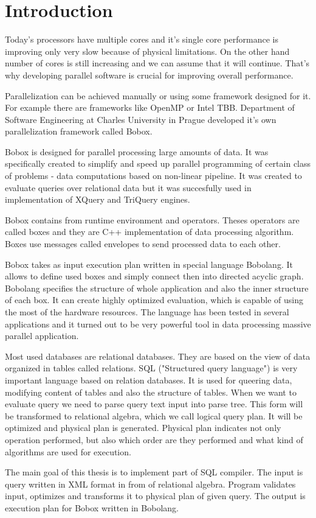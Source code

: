 \chapter*{Introduction}
Today's processors have multiple cores and it's single core performance is improving only very slow because of physical limitations. On the other hand number of cores is still increasing and we can assume that it will continue. That's why developing parallel software is crucial for improving overall performance.

Parallelization can be achieved manually or using some framework designed for it. For example there are frameworks like OpenMP or Intel TBB. Department of Software Engineering at Charles University in Prague developed it's own parallelization framework called Bobox\cite{bobox}.

Bobox is designed for parallel processing large amounts of data. It was specifically created to simplify and speed up parallel programming of certain class of problems - data computations based on non-linear pipeline. It was created to evaluate queries over relational data but it was succesfully used in implementation of XQuery and TriQuery engines.

Bobox contains from runtime environment and operators. Theses operators are called boxes and they are C++ implementation of data processing algorithm. Boxes use messages called envelopes to send processed data to each other. 

Bobox takes as input execution plan written in special language Bobolang\cite{bobolang}. It allows to define used boxes and simply connect then into directed acyclic graph. Bobolang specifies the structure of whole application and also the inner structure of each box. It can create highly optimized evaluation, which is capable of using the most of the hardware resources. The language has been tested in several applications and it turned out to be very powerful tool in data processing massive parallel application.

Most used databases are relational databases. They are based on the view of data organized in tables called relations. SQL\cite{database} ("Structured query language") is very important language based on relation databases. It is used for queering data, modifying content of tables and also the structure of tables. When we want to evaluate query we need to parse query text input into parse tree. This form will be transformed to relational algebra, which we call logical query plan. It will be optimized and physical plan is generated. Physical plan indicates not only operation performed, but also which order are they performed and what kind of algorithms are used for execution.

The main goal of this thesis is to implement part of SQL compiler. The input is query written in XML format in from of relational algebra. Program validates input, optimizes and transforms it to physical plan of given query. The output is execution plan for Bobox written in Bobolang.
